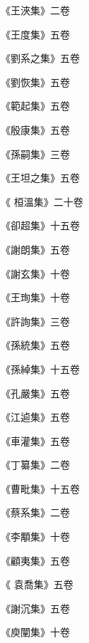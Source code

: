 \begin{pinyinscope}
 《王浹集》二卷



 《王度集》五卷



 《劉系之集》五卷



 《劉恢集》五卷



 《範起集》五卷



 《殷康集》五卷



 《孫嗣集》三卷



 《王坦之集》五卷



 《
 桓溫集》二十卷



 《卻超集》十五卷



 《謝朗集》五卷



 《謝玄集》十卷



 《王珣集》十卷



 《許詢集》三卷



 《孫統集》五卷



 《孫綽集》十五卷



 《孔嚴集》五卷



 《江逌集》五卷



 《車灌集》五卷



 《丁纂集》二卷



 《曹毗集》十五卷



 《蔡系集》二卷



 《李顒集》十卷



 《顧夷集》五卷



 《
 袁喬集》五卷



 《謝沉集》五卷



 《庾闡集》十卷




\end{pinyinscope}
